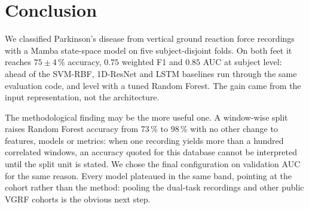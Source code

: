 \section{Conclusion}

We classified Parkinson's disease from vertical ground reaction force
recordings with a Mamba state-space model on five subject-disjoint folds. On
both feet it reaches $75 \pm 4$\,\% accuracy, $0.75$ weighted F1 and $0.85$ AUC
at subject level: ahead of the SVM-RBF, 1D-ResNet and LSTM baselines run
through the same evaluation code, and level with a tuned Random Forest. The
gain came from the input representation, not the architecture.

The methodological finding may be the more useful one. A window-wise split
raises Random Forest accuracy from 73\,\% to 98\,\% with no other change to
features, models or metrics: when one recording yields more than a hundred
correlated windows, an accuracy quoted for this database cannot be interpreted
until the split unit is stated. We chose the final configuration on validation
AUC for the same reason. Every model plateaued in the same band, pointing at
the cohort rather than the method: pooling the dual-task recordings and other
public VGRF cohorts is the obvious next step.

